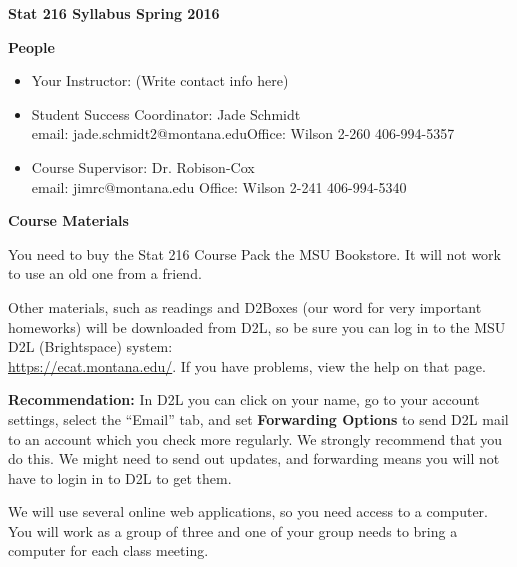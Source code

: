 \setcounter{page}{1}

\def\theTopic{Intro \& Syllabus }
\def\dayNum{1}


\begin{center}
\vspace*{.1in}
{\bf {\large Stat 216 Syllabus Spring 2016}}\\
\end{center}
\vspace{-.1in}

\begin{center}
  {\bf People}
\end{center}
\begin{itemize}
\item Your Instructor: (Write contact info here) \vspace{5.5cm}
\item Student Success Coordinator:  Jade Schmidt\\
     email: jade.schmidt2@montana.edu\hfill Office: Wilson 2-260 \hfill
     406-994-5357
   \item Course Supervisor: Dr. Robison-Cox\\
     email: jimrc@montana.edu \hfill  Office: Wilson 2-241 \hfill
     406-994-5340
\end{itemize}


\begin{center}
  {\bf Course Materials}
\end{center}
  You need to buy the Stat 216  Course Pack  the MSU
  Bookstore.  It will not work to use an old one from a friend.

  Other materials, such as readings and D2Boxes (our word for
  very important homeworks) will be downloaded from D2L, so be
  sure you can log in to the MSU D2L (Brightspace) system:\\
   \url{https://ecat.montana.edu/}.  If you have problems, view the
   help on that page.

  {\bf Recommendation:}  In D2L you can click on your name, go to your
    account settings,  select  the ``Email'' tab, and set {\bf
      Forwarding Options} to send D2L mail to an account which you
    check more regularly.  We strongly recommend that you do this.  We
    might need to send out updates, and forwarding means you will not
    have to login in to D2L to get them.

  We will  use several online web applications,  so you need
  access to a computer.  You will work as a group of three and one of
  your group needs to bring a computer for each class meeting.\\
 
